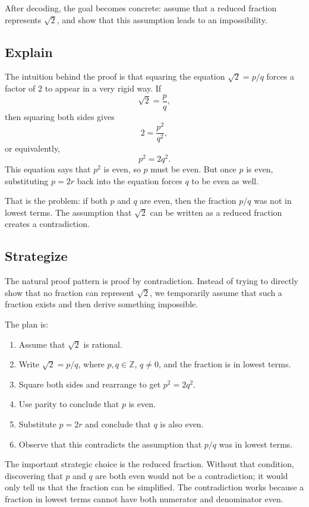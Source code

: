 \documentclass[11pt,a4paper]{article}
\begin{document}
After decoding, the goal becomes concrete: assume that a reduced fraction represents \(\sqrt{2}\), and show that this assumption leads to an impossibility.

\subsection{Explain}

The intuition behind the proof is that squaring the equation \(\sqrt{2} = p/q\) forces a factor of \(2\) to appear in a very rigid way. If
\[
    \sqrt{2} = \frac{p}{q},
\]
then squaring both sides gives
\[
    2 = \frac{p^2}{q^2},
\]
or equivalently,
\[
    p^2 = 2q^2.
\]
This equation says that \(p^2\) is even, so \(p\) must be even. But once \(p\) is even, substituting \(p = 2r\) back into the equation forces \(q\) to be even as well.

That is the problem: if both \(p\) and \(q\) are even, then the fraction \(p/q\) was not in lowest terms. The assumption that \(\sqrt{2}\) can be written as a reduced fraction creates a contradiction.

\subsection{Strategize}

The natural proof pattern is proof by contradiction. Instead of trying to directly show that no fraction can represent \(\sqrt{2}\), we temporarily assume that such a fraction exists and then derive something impossible.

The plan is:

\begin{enumerate}[label=\arabic*., leftmargin=*]
    \item Assume that \(\sqrt{2}\) is rational.
    \item Write \(\sqrt{2} = p/q\), where \(p,q \in \mathbb{Z}\), \(q \neq 0\), and the fraction is in lowest terms.
    \item Square both sides and rearrange to get \(p^2 = 2q^2\).
    \item Use parity to conclude that \(p\) is even.
    \item Substitute \(p = 2r\) and conclude that \(q\) is also even.
    \item Observe that this contradicts the assumption that \(p/q\) was in lowest terms.
\end{enumerate}

The important strategic choice is the reduced fraction. Without that condition, discovering that \(p\) and \(q\) are both even would not be a contradiction; it would only tell us that the fraction can be simplified. The contradiction works because a fraction in lowest terms cannot have both numerator and denominator even.
\end{document}
